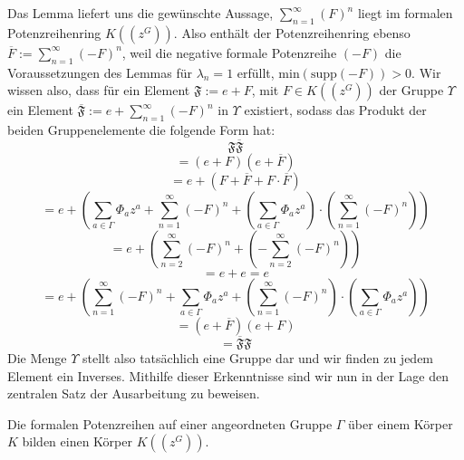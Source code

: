 Das Lemma liefert uns die gewünschte Aussage, $ \sum_{n=1}^{\infty}(F)^n$ liegt im formalen Potenzreihenring $K\left(\left(z^{G}\right)\right)$. Also enthält der Potenzreihenring ebenso $\overline{F} := \sum_{n=1}^{\infty}(-F)^n $, weil die negative formale Potenzreihe $\left(-F\right)$ die Voraussetzungen des Lemmas für $\lambda_n = 1$ erfüllt, $\text{min}\left(\text{supp}\left(-F\right)\right) > 0.$ 
Wir wissen also, dass für ein Element $\mathfrak{F} := e + F$, mit $F \in K\left(\left(z^{G}\right)\right)$ der Gruppe $\Upsilon$ ein Element $\overline{\mathfrak{F}} := e +\sum_{n=1}^{\infty}(-F)^n $ in $\Upsilon$ existiert, sodass das Produkt der beiden Gruppenelemente die folgende Form hat:
\[\mathfrak{F} \overline{\mathfrak{F}} \]
\[= \left(e  + F\right) \left(e + \overline{F}\right)\]
\[ = e + \left(F + \overline{F} + F\cdot\overline{F}\right) \]
\[= e + \left(\sum_{a \in \Gamma}\Phi_a z^a + \sum_{n=1}^{\infty}(-F)^n + \left(\sum_{a \in \Gamma}\Phi_a z^a\right)\cdot \left(\sum_{n=1}^{\infty}(-F)^n\right)\right)\]
\[ = e + \left( \sum_{n=2}^{\infty}(-F)^n + \left( - \sum_{n=2}^{\infty}(-F)^{n}\right)\right)\]
\[= e + e = e\]
\[ = e + \left(\sum_{n=1}^{\infty}(-F)^n + \sum_{a \in \Gamma}\Phi_a z^a + \left(\sum_{n=1}^{\infty}(-F)^n\right)\cdot \left(\sum_{a \in \Gamma}\Phi_a z^a\right)\right)\]
\[ =  \left(e  + \overline{F}\right) \left(e + F\right)\]
\[ = \mathfrak{\overline{F}}\mathfrak{F}\]
Die Menge $\Upsilon$ stellt also tatsächlich eine Gruppe dar und wir finden zu jedem Element ein Inverses. Mithilfe dieser Erkenntnisse sind wir nun in der Lage den zentralen Satz der Ausarbeitung zu beweisen.
\newpage
\begin{satz}
Die formalen Potenzreihen auf einer angeordneten Gruppe $\Gamma$ über einem Körper $K$ bilden einen Körper $K\left(\left(z^{G}\right)\right)$.
\end{satz}
